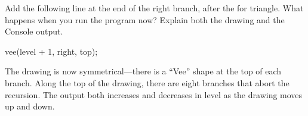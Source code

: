 \Q \label{key2}
Add the following line at the end of the right branch, after the  for triangle.
What happens when you run the program now?
Explain both the drawing and the Console output.

\begin{javalst}
vee(level + 1, right, top);
\end{javalst}

\begin{answer}[5em]
The drawing is now symmetrical---there is a ``Vee'' shape at the top of each branch.
Along the top of the drawing, there are eight branches that abort the recursion.
The output both increases and decreases in level as the drawing moves up and down.
\end{answer}

